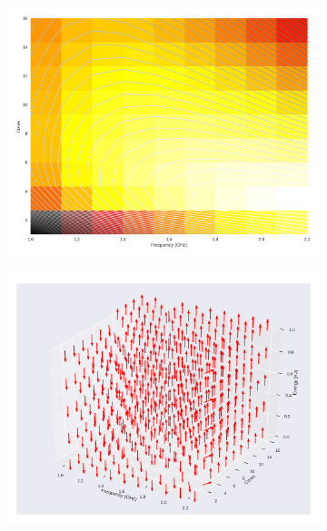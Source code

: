 \begin{figure}[H]

	\centering

	\begin{subfigure}[b]{0.45\textwidth}

		\includegraphics[width=\textwidth]{models/figures/analisys/pdyn3.png}

	\end{subfigure}


	\begin{subfigure}[b]{0.45\textwidth}

		\includegraphics[width=\textwidth]{models/figures/analisys/pdyn3_3d.png}

	\end{subfigure}

\end{figure}


